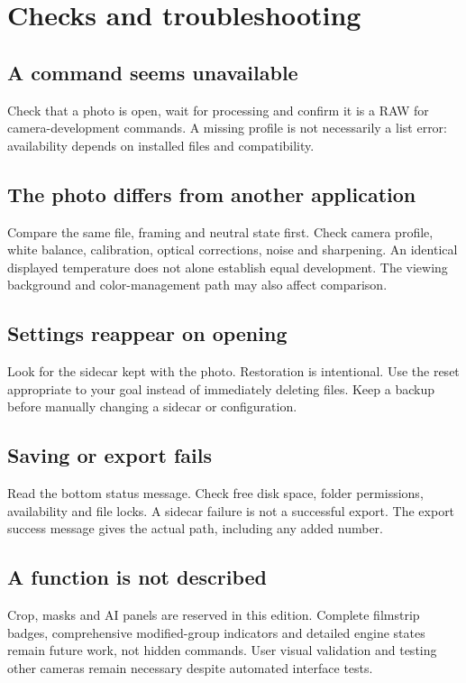 \chapter{Checks and troubleshooting}
\section{A command seems unavailable}
Check that a photo is open, wait for processing and confirm it is a RAW for
camera-development commands. A missing profile is not necessarily a list error:
availability depends on installed files and compatibility.

\section{The photo differs from another application}
Compare the same file, framing and neutral state first. Check camera profile,
white balance, calibration, optical corrections, noise and sharpening.
An identical displayed temperature does not alone establish equal development.
The viewing background and color-management path may also affect comparison.

\section{Settings reappear on opening}
Look for the  sidecar kept with the photo. Restoration is intentional.
Use the reset appropriate to your goal instead of immediately deleting files.
Keep a backup before manually changing a sidecar or configuration.

\section{Saving or export fails}
Read the bottom status message. Check free disk space, folder permissions,
availability and file locks. A sidecar failure is not a successful export.
The export success message gives the actual path, including any added number.

\section{A function is not described}
Crop, masks and AI panels are reserved in this edition. Complete filmstrip
badges, comprehensive modified-group indicators and detailed engine states
remain future work, not hidden commands. User visual validation and testing
other cameras remain necessary despite automated interface tests.
